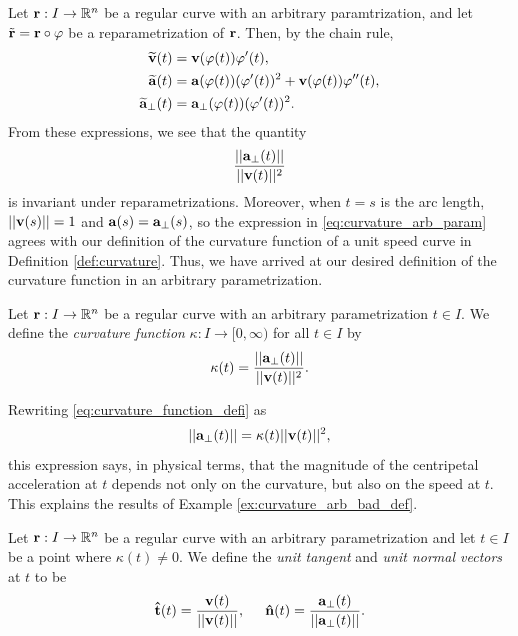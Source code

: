 \documentclass[12pt,letterpaper,reqno]{article}
\numberwithin{equation}{section}
\newcommand{\R}{\ensuremath{\mathbb R}}
\newcommand{\bv}{{\bf v}}
\newcommand{\ba}{{\bf a}}
\newcommand{\bbr}{{\bf r}}
\newcommand{\ut}{{\bf {\hat{t}}}}
\newcommand{\un}{{\bf {\hat{n}}}}
\begin{document}
{Let $\bbr:I \to \R^n$ be a regular curve with an arbitrary paramtrization, and let $\tilde{\bbr}=\bbr \circ \varphi$ be a reparametrization of $\bbr$. Then, by the chain rule,
\begin{align*}
	\widetilde{\bv}(t)&=\bv(\varphi(t))\varphi'(t), \\
	\widetilde{\ba}(t)&=\ba(\varphi(t))(\varphi'(t))^2+\bv(\varphi(t))\varphi''(t), \\
\widetilde{\ba}_\perp(t)&=\ba_\perp(\varphi(t))(\varphi'(t))^2.
\end{align*}
From these expressions, we see that the quantity
\begin{align}\label{eq:curvature_arb_param}
	\frac{||\ba_\perp(t)||}{||\bv(t)||^2}
\end{align}
is invariant under reparametrizations. Moreover, when $t=s$ is the arc length, $||\bv(s)||=1$ and $\ba(s)=\ba_\perp(s)$, so the expression in \eqref{eq:curvature_arb_param} agrees with our definition of the curvature function of a unit speed curve in Definition \ref{def:curvature}. Thus, we have arrived at our desired definition of the curvature function in an arbitrary parametrization.
\begin{defn}
	Let $\bbr:I \to \R^n$ be a regular curve with an arbitrary parametrization $t \in I$. We define the \emph{curvature function} $\kappa:I \to [0,\infty)$ for all $t \in I$ by
	\begin{align}\label{eq:curvature_function_defi}
		\kappa(t)=\frac{||\ba_\perp(t)||}{||\bv(t)||^2}.
	\end{align}
\end{defn}
Rewriting \eqref{eq:curvature_function_defi} as 
\begin{align*}
	||\ba_\perp(t)||=\kappa(t)||\bv(t)||^2,
\end{align*}
this expression says, in physical terms, that the magnitude of the centripetal acceleration at $t$ depends not only on the curvature, but also on the speed at $t$. This explains the results of Example \ref{ex:curvature_arb_bad_def}.

\begin{defn}
	Let $\bbr:I \to \R^n$ be a regular curve with an arbitrary parametrization and let $t \in I$ be a point where $\kappa(t) \neq 0$. We define the \emph{unit tangent} and \emph{unit normal vectors} at $t$ to be 
	\begin{align*}
		\ut(t)=\frac{\bv(t)}{||\bv(t)||}, \hspace{0.5cm} \un(t)=\frac{\ba_\perp(t)}{||\ba_\perp(t)||}.
	\end{align*} 
\end{defn}

}
\end{document}
